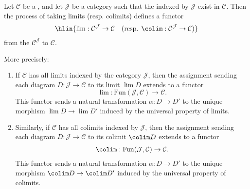 
\begin{theorem} \label{theorem:limits_and_colimits_as_functors_from_functor_category_to_value_category}
Let $\mathcal{C}$ be a , and let $\mathcal{J}$ be a category such that the  indexed by $\mathcal{J}$ exist in $\mathcal{C}$. Then the process of taking limits (resp. colimits) defines a functor
$$\hlin{\lim : \mathcal{C}^\mathcal{J} \to \mathcal{C} \quad \text{(resp. } \colim : \mathcal{C}^\mathcal{J} \to \mathcal{C}\text{)}}$$
from the  $\mathcal{C}^\mathcal{J}$ to $\mathcal{C}$.

More precisely:
\begin{enumerate}
    \item If $\mathcal{C}$ has all limits indexed by the category $\mathcal{J}$, then the assignment sending each diagram $D : \mathcal{J} \to \mathcal{C}$ to its limit $\lim D$ extends to a functor
    $$\lim : \mathrm{Fun}(\mathcal{J}, \mathcal{C}) \to \mathcal{C}.$$
    This functor sends a natural transformation $\alpha : D \to D'$ to the unique morphism $\lim D \to \lim D'$ induced by the universal property of limits.

    \item Similarly, if $\mathcal{C}$ has all colimits indexed by $\mathcal{J}$, then the assignment sending each diagram $D : \mathcal{J} \to \mathcal{C}$ to its colimit $\colim D$ extends to a functor
    $$\colim : \mathrm{Fun}(\mathcal{J}, \mathcal{C}) \to \mathcal{C}.$$
    This functor sends a natural transformation $\alpha : D \to D'$ to the unique morphism $\colim D \to \colim D'$ induced by the universal property of colimits.
\end{enumerate}
\end{theorem}

